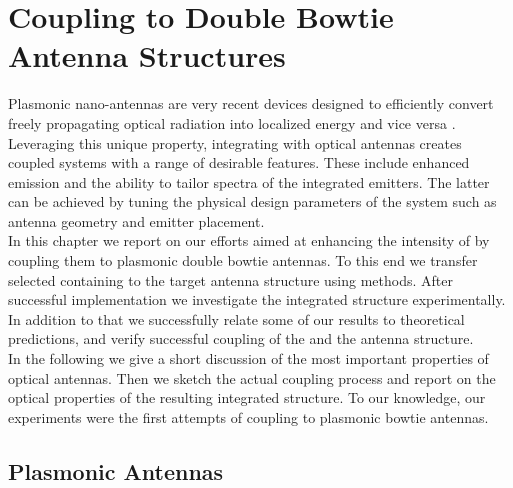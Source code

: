 \section[Coupling \Nds to Optical Antennas]{Coupling \Nds to Double Bowtie Antenna Structures} \label{sec::coupling_antennas}

	Plasmonic nano-antennas are very recent devices designed to efficiently convert freely propagating optical radiation into localized energy and vice versa \cite{Bharadwaj2009, ballanis1997antenna, ding2009understanding}. Leveraging this unique property, integrating \sivs with optical antennas creates coupled systems with a range of desirable features. These include enhanced \pl emission and the ability to tailor \pl spectra of the integrated emitters. The latter can be achieved by tuning the physical design parameters of the system such as antenna geometry and emitter placement.
	\\
	In this chapter we report on our efforts aimed at enhancing the \pl intensity of \sivs by coupling them to plasmonic double bowtie antennas. To this end we transfer selected \nds containing \sivs to the target antenna structure using \pp methods. After successful implementation we investigate the integrated structure experimentally. In addition to that we successfully relate some of our results to theoretical predictions, and verify successful coupling of the \siv and the antenna structure.
	\\
	In the following we give a short discussion of the most important properties of optical antennas. Then we sketch the actual coupling process and report on the optical properties of the resulting integrated structure. To our knowledge, our experiments were the first attempts of coupling \sivs to plasmonic bowtie antennas.

	\subsection{Plasmonic Antennas}

